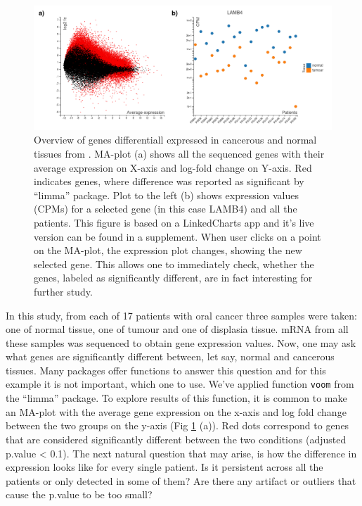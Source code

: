 \documentclass[twocolumn,10pt]{article}
\begin{document}
\begin{figure}
	\includegraphics[width=\textwidth]{FigD/figD.png}
	\caption{Overview of genes differentiall expressed in cancerous and normal tissues from \citet{conway_2015}. MA-plot (a) shows all the sequenced genes with their average expression on X-axis and log-fold change on Y-axis. Red indicates genes, where difference was reported as significant by ``limma'' package. Plot to the left (b) shows expression values (CPMs) for a selected gene (in this case LAMB4) and all the patients. This figure is based on a LinkedCharts app and it's live version can be found in a supplement. When user clicks on a point on the MA-plot, the expression plot changes, showing the new selected gene. This allows one to immediately check, whether the genes, labeled as significantly different, are in fact interesting for further study.}
	\label{FigD}
\end{figure}

In this study, from each of 17 patients with oral cancer three samples were taken: one of normal tissue, one of tumour and one of displasia tissue. mRNA from all these samples was sequenced to obtain gene expression values. Now, one may ask what genes are significantly different between, let say, normal and cancerous tissues. Many packages offer functions to answer this question and for this example it is not important, which one to use. We've applied function \texttt{voom} from the ``limma'' \citep{ritchie_2015} package. To explore results of this function, it is common to make an MA-plot with the average gene expression on the x-axis and log fold change between the two groups on the y-axis (Fig \ref{FigD} (a)). Red dots correspond to genes that are considered significantly different between the two conditions (adjusted p.value < 0.1). The next natural question that may arise, is how the difference in expression looks like for every single patient. Is it persistent across all the patients or only detected in some of them? Are there any artifact or outliers that cause the p.value to be too small?
\end{document}
